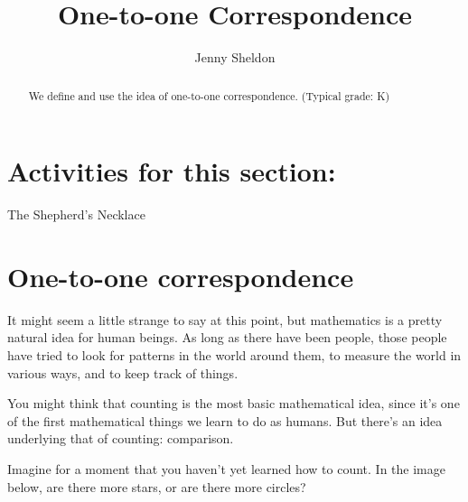 \documentclass{ximera}
\title{One-to-one Correspondence}
\author{Jenny Sheldon}
\begin{document}
\begin{abstract}
We define and use the idea of one-to-one correspondence. (Typical grade: K)
\end{abstract}
\maketitle

\section{Activities for this section:} The Shepherd's Necklace


\section{One-to-one correspondence}


It might seem a little strange to say at this point, but mathematics is a pretty natural idea for 
human beings. As long as there have been people, those people have tried to look for patterns in the world 
around them, to measure the world in various ways, and to keep track of things.

You might think that counting is the most basic mathematical idea, since it's one of the first mathematical 
things we learn to do as humans. But there's an idea underlying that of counting: comparison.

\begin{question}
Imagine for a moment that you haven't yet learned how to count. In the image below, are there more stars, or 
are there more circles?

\begin{center}
\end{center}

\begin{multipleChoice}
\end{multipleChoice}
\end{question}
\end{document}
